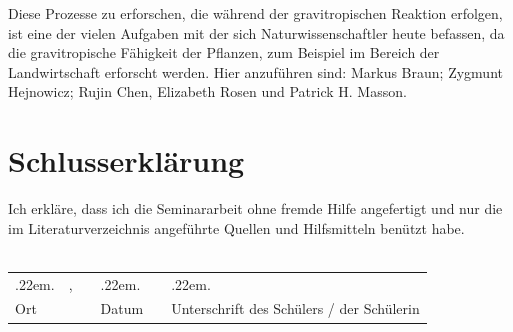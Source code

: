 \documentclass[
11pt, 
ngerman,
listof=totocnumbered,
oneside,
bibliography=totocnumbered,
abstracton
]{scrreprt}
\makeatletter
\newcommand \Dotfill {\leavevmode \cleaders \hb@xt@ .22em{\hss .\hss }\hfill \kern \z@}
\makeatother
\begin{document}
Diese Prozesse zu erforschen, die während der gravitropischen Reaktion erfolgen, ist eine der vielen Aufgaben mit der sich Naturwissenschaftler  heute befassen, da die gravitropische Fähigkeit der Pflanzen, zum Beispiel im Bereich der Landwirtschaft erforscht werden\parencite[343]{Chen1999}.
Hier anzuführen sind: Markus Braun; Zygmunt Hejnowicz; Rujin Chen, Elizabeth Rosen und Patrick H. Masson.


\printbibliography

\listoffigures

\chapter {Schlusserklärung}

Ich erkläre, dass ich die Seminararbeit ohne fremde Hilfe angefertigt und nur die im Literaturverzeichnis angeführte Quellen und Hilfsmitteln benützt habe.
\\
\\

\setlength\tabcolsep{0pt}\noindent\begin{tabular}{p{} p{} p{} p{} p{} p{}}
	\Dotfill & \hfill, & & \Dotfill &  & \Dotfill \\ 
	Ort & & & Datum &  & Unterschrift des Schülers / der Schülerin \\
\end{tabular}
\end{document}
